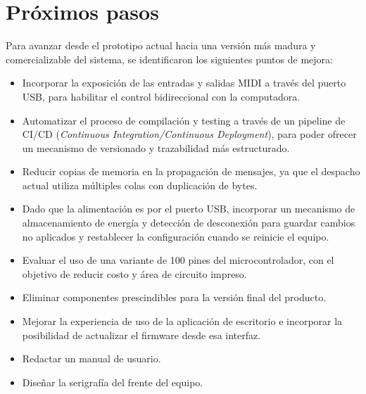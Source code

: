 
\section{Próximos pasos}

Para avanzar desde el prototipo actual hacia una versión más madura y comercializable del sistema, se identificaron los siguientes puntos de mejora:
\begin{itemize}
	\item Incorporar la exposición de las entradas y salidas MIDI a través del puerto USB, para habilitar el control bidireccional con la computadora.
	\item Automatizar el proceso de compilación y testing a través de un pipeline de CI/CD (\textit{Continuous Integration/Continuous Deployment}), para poder ofrecer un mecanismo de versionado y trazabilidad más estructurado.
	\item Reducir copias de memoria en la propagación de mensajes, ya que el despacho actual utiliza múltiples colas con duplicación de bytes.
	\item Dado que la alimentación es por el puerto USB, incorporar un mecanismo de almacenamiento de energía y detección de desconexión para guardar cambios no aplicados y restablecer la configuración cuando se reinicie el equipo.
	\item Evaluar el uso de una variante de 100 pines del microcontrolador, con el objetivo de reducir costo y área de circuito impreso.
	\item Eliminar componentes prescindibles para la versión final del producto.
	\item Mejorar la experiencia de uso de la aplicación de escritorio e incorporar la posibilidad de actualizar el firmware desde esa interfaz.
	\item Redactar un manual de usuario.
	\item Diseñar la serigrafía del frente del equipo.
\end{itemize}
